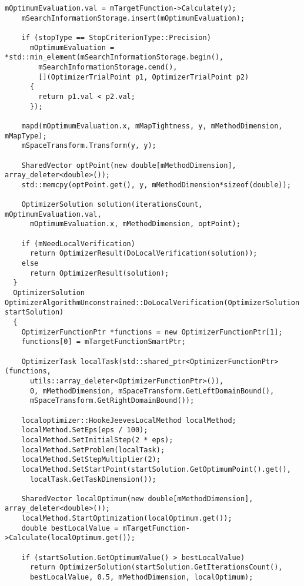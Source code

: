 \begin{lstlisting}[frame=single]
    mOptimumEvaluation.val = mTargetFunction->Calculate(y);
    mSearchInformationStorage.insert(mOptimumEvaluation);

    if (stopType == StopCriterionType::Precision)
      mOptimumEvaluation = *std::min_element(mSearchInformationStorage.begin(),
        mSearchInformationStorage.cend(),
        [](OptimizerTrialPoint p1, OptimizerTrialPoint p2)
      {
        return p1.val < p2.val;
      });

    mapd(mOptimumEvaluation.x, mMapTightness, y, mMethodDimension, mMapType);
    mSpaceTransform.Transform(y, y);

    SharedVector optPoint(new double[mMethodDimension], array_deleter<double>());
    std::memcpy(optPoint.get(), y, mMethodDimension*sizeof(double));

    OptimizerSolution solution(iterationsCount, mOptimumEvaluation.val,
      mOptimumEvaluation.x, mMethodDimension, optPoint);

    if (mNeedLocalVerification)
      return OptimizerResult(DoLocalVerification(solution));
    else
      return OptimizerResult(solution);
  }
  OptimizerSolution OptimizerAlgorithmUnconstrained::DoLocalVerification(OptimizerSolution startSolution)
  {
    OptimizerFunctionPtr *functions = new OptimizerFunctionPtr[1];
    functions[0] = mTargetFunctionSmartPtr;

    OptimizerTask localTask(std::shared_ptr<OptimizerFunctionPtr>(functions,
      utils::array_deleter<OptimizerFunctionPtr>()),
      0, mMethodDimension, mSpaceTransform.GetLeftDomainBound(),
      mSpaceTransform.GetRightDomainBound());

    localoptimizer::HookeJeevesLocalMethod localMethod;
    localMethod.SetEps(eps / 100);
    localMethod.SetInitialStep(2 * eps);
    localMethod.SetProblem(localTask);
    localMethod.SetStepMultiplier(2);
    localMethod.SetStartPoint(startSolution.GetOptimumPoint().get(),
      localTask.GetTaskDimension());

    SharedVector localOptimum(new double[mMethodDimension], array_deleter<double>());
    localMethod.StartOptimization(localOptimum.get());
    double bestLocalValue = mTargetFunction->Calculate(localOptimum.get());

    if (startSolution.GetOptimumValue() > bestLocalValue)
      return OptimizerSolution(startSolution.GetIterationsCount(),
      bestLocalValue, 0.5, mMethodDimension, localOptimum);


\end{lstlisting}
